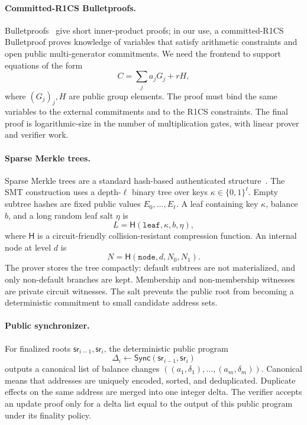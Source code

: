 \documentclass[runningheads]{llncs}
\newcommand{\bits}{\{0,1\}}
\newcommand{\CRH}{\mathsf{H}}
\newcommand{\sr}{\mathsf{sr}}
\newcommand{\Sync}{\mathsf{Sync}}
\newcommand{\dlist}{\Delta}
\begin{document}
\paragraph{Committed-R1CS Bulletproofs.}
Bulletproofs~\cite{Bulletproofs18} give short inner-product proofs; in our use, a committed-R1CS Bulletproof proves knowledge of variables that satisfy arithmetic constraints and open public multi-generator commitments.  We need the frontend to support equations of the form
\[
        C=\sum_j a_jG_j+rH,
\]
where \((G_j)_j,H\) are public group elements.  The proof must bind the same variables to the external commitments and to the R1CS constraints.  The final proof is logarithmic-size in the number of multiplication gates, with linear prover and verifier work.

\paragraph{Sparse Merkle trees.}
Sparse Merkle trees are a standard hash-based authenticated structure~\cite{Merkle88}.  The SMT construction uses a depth-\(\ell\) binary tree over keys \(\kappa\in\bits^\ell\).  Empty subtree hashes are fixed public values \(E_0,\ldots,E_\ell\).  A leaf containing key \(\kappa\), balance \(b\), and a long random leaf salt \(\eta\) is
\[
        L=\CRH(\mathtt{leaf},\kappa,b,\eta),
\]
where \(\CRH\) is a circuit-friendly collision-resistant compression function.  An internal node at level \(d\) is
\[
        N=\CRH(\mathtt{node},d,N_0,N_1).
\]
The prover stores the tree compactly: default subtrees are not materialized, and only non-default branches are kept.  Membership and non-membership witnesses are private circuit witnesses.  The salt prevents the public root from becoming a deterministic commitment to small candidate address sets.

\paragraph{Public synchronizer.}
For finalized roots \(\sr_{i-1},\sr_i\), the deterministic public program
\[
        \dlist_i\leftarrow \Sync(\sr_{i-1},\sr_i)
\]
outputs a canonical list of balance changes \(((a_1,\delta_1),\ldots,(a_m,\delta_m))\).  Canonical means that addresses are uniquely encoded, sorted, and deduplicated.  Duplicate effects on the same address are merged into one integer delta.  The verifier accepts an update proof only for a delta list equal to the output of this public program under its finality policy.
\end{document}
